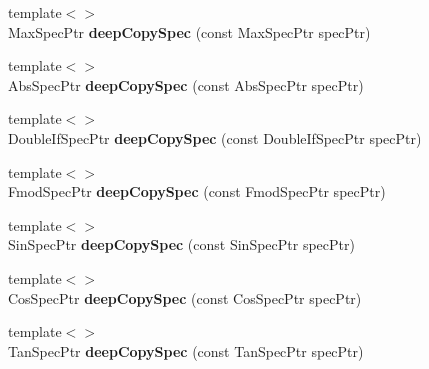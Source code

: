 \begin{DoxyCompactItemize}
\item 
\hypertarget{namespacegiskard__suturo_a047a547f79afeb0ad9e2deb226ae296d}{{\footnotesize template$<$$>$ }\\Max\-Spec\-Ptr {\bfseries deep\-Copy\-Spec} (const Max\-Spec\-Ptr spec\-Ptr)}\label{namespacegiskard__suturo_a047a547f79afeb0ad9e2deb226ae296d}

\item 
\hypertarget{namespacegiskard__suturo_ac99d3e4161f7c9bcda51e371a64394fe}{{\footnotesize template$<$$>$ }\\Abs\-Spec\-Ptr {\bfseries deep\-Copy\-Spec} (const Abs\-Spec\-Ptr spec\-Ptr)}\label{namespacegiskard__suturo_ac99d3e4161f7c9bcda51e371a64394fe}

\item 
\hypertarget{namespacegiskard__suturo_acac35c3e24eb59590a44f2e0a7017778}{{\footnotesize template$<$$>$ }\\Double\-If\-Spec\-Ptr {\bfseries deep\-Copy\-Spec} (const Double\-If\-Spec\-Ptr spec\-Ptr)}\label{namespacegiskard__suturo_acac35c3e24eb59590a44f2e0a7017778}

\item 
\hypertarget{namespacegiskard__suturo_af6b4511f5d8346a4506c1f8b779739ef}{{\footnotesize template$<$$>$ }\\Fmod\-Spec\-Ptr {\bfseries deep\-Copy\-Spec} (const Fmod\-Spec\-Ptr spec\-Ptr)}\label{namespacegiskard__suturo_af6b4511f5d8346a4506c1f8b779739ef}

\item 
\hypertarget{namespacegiskard__suturo_a022f481bb6796e897908828ee65077e0}{{\footnotesize template$<$$>$ }\\Sin\-Spec\-Ptr {\bfseries deep\-Copy\-Spec} (const Sin\-Spec\-Ptr spec\-Ptr)}\label{namespacegiskard__suturo_a022f481bb6796e897908828ee65077e0}

\item 
\hypertarget{namespacegiskard__suturo_a2d266b455013e45fa6690d0696c3e137}{{\footnotesize template$<$$>$ }\\Cos\-Spec\-Ptr {\bfseries deep\-Copy\-Spec} (const Cos\-Spec\-Ptr spec\-Ptr)}\label{namespacegiskard__suturo_a2d266b455013e45fa6690d0696c3e137}

\item 
\hypertarget{namespacegiskard__suturo_a1d4b6d6b2471ffd113e28ca6aa940bf7}{{\footnotesize template$<$$>$ }\\Tan\-Spec\-Ptr {\bfseries deep\-Copy\-Spec} (const Tan\-Spec\-Ptr spec\-Ptr)}\label{namespacegiskard__suturo_a1d4b6d6b2471ffd113e28ca6aa940bf7}


\end{DoxyCompactItemize}
